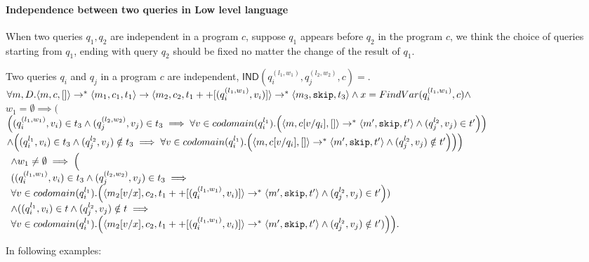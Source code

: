 \documentclass[a4paper,11pt]{article}
\begin{document}
\paragraph{Independence between two queries in Low level language}
%
When two queries $q_1,q_2$ are independent in a program $c$, suppose $q_1$ appears before $q_2$ in the program $c$, we think the choice of queries starting from $q_1$, ending with query $q_2$ should be fixed no matter the change of the result of $q_1$.\\
%
\begin{defn}
Two queries $q_i$ and $q_j$ in a program $c$ are independent,
$\mathsf{IND}(q^{(l_1, w_1)}_i, q^{(l_2, w_2)}_j, c)=$.
$ \forall m, D. \langle m, c,  [] \rangle \rightarrow^{*} \langle m_1, c_1,
  t_1 \rangle \rightarrow \langle m_2, c_2,
  t_1++[(q^{(l_1, w_1)}_i, v_i)] \rangle \rightarrow^{*} \langle m_3, \mathtt{skip},
  t_3 \rangle \land x  = FindVar(q^{(l_1,
  w_1)}_i, c) \land $\\
$w_1 = \emptyset \implies  \Big (
$\\
$ 
\left((q^{(l_1, w_1)}_i, v_i) \in t_3 \land (q^{(l_2, w_2)}_j, v_j) \in t_3  \implies \forall v \in codomain(q^{l_1}_i). 
\left( \config{m, c[v/q_i],  []} \rightarrow^* \config{m', \eskip,  t'} \land (q^{l_2}_j, v_j) \in t'
\right)
\right)$ \\
$ \land
\left( (q^{l_1}_i, v_i) \in t_3 \land (q^{l_2}_j, v_j) \notin t_3  \implies \forall v\in codomain(q^{l_1}_i). 
\left( \config{m, c[v/q_i],  []} \rightarrow^{*} \config{m', \eskip,  t'} \land (q^{l_2}_j, v_j) \notin t'
\right)
\right)
\Big ) $ \\
$\begin{array}{l}
\land {w_1} \not = \emptyset \implies  \Big (  \\
 ( (q^{(l_1, w_1)}_i, v_i) \in t_3 \land (q^{(l_2, w_2)}_j, v_j)
  \in t_3  \implies \\
\forall v \in codomain(q^{l_1}_i). 
\left( \config{m_2[v/x], c_2, t_1++[(q^{(l_1, w_1)}_i, v_i)] } \rightarrow^{*} \config{m', \eskip,  t'}   \land (q^{l_2}_j, v_j) \in t'
\right )
 ) \\
 \land
( (q^{l_1}_i, v_i) \in t \land (q^{l_2}_j, v_j) \notin t
  \implies  \\
 \forall v\in codomain(q^{l_1}_i). 
\left( \config{m_2[v/x], c_2, t_1++[(q^{(l_1, w_1)}_i, v_i)] } \rightarrow^{*} \config{m', \eskip,  t'} \land (q^{l_2}_j, v_j) \notin t'
 )
\right )
\Big ).
\end{array}
$
\end{defn}
%
\noindent
In following examples:
\end{document}
